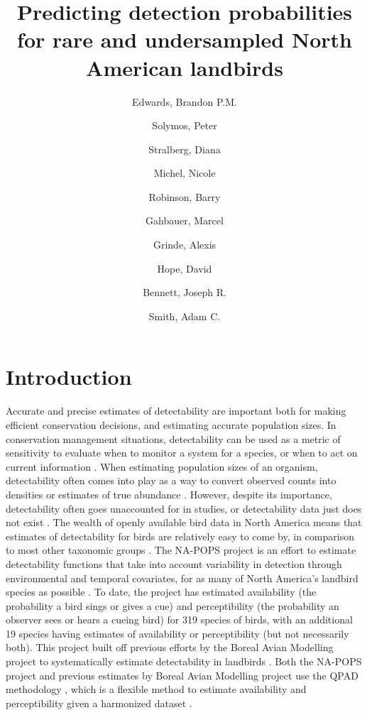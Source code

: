 \documentclass[12pt]{article}
\title{Predicting detection probabilities for rare and undersampled North American landbirds}
\author{
	Edwards, Brandon P.M.\\
	\and
	Solymos, Peter\\
	\and
	Stralberg, Diana\\
	\and
	Michel, Nicole\\
	\and
	Robinson, Barry\\
	\and
	Gahbauer, Marcel\\
	\and
	Grinde, Alexis\\
	\and
	Hope, David\\
	\and
	Bennett, Joseph R.\\
	\and
	Smith, Adam C.\\
}
\begin{document}
\maketitle

\begin{abstract}

\end{abstract}

\section{Introduction}

\par Accurate and precise estimates of detectability are important both for making efficient conservation decisions, and estimating accurate population sizes.
In conservation management situations, detectability can be used as a metric of sensitivity to evaluate when to monitor a system for a species, or when to act on current information \citep{canessa_when_2015, bennett_when_2018}. 
When estimating population sizes of an organism, detectability often comes into play as a way to convert observed counts into densities or estimates of true abundance \citep{solymos_calibrating_2013, johnson_defense_2008}.
However, despite its importance, detectability often goes unaccounted for in studies, or detectability data just does not exist \citep{bennett_how_2023}.
The wealth of openly available bird data in North America means that estimates of detectability for birds are relatively easy to come by, in comparison to most other taxonomic groups \citep{bennett_how_2023}. 
The NA-POPS project is an effort to estimate detectability functions that take into account variability in detection through environmental and temporal covariates, for as many of North America’s landbird species as possible \citep{edwards_point_2023}.
To date, the project has estimated availability (the probability a bird sings or gives a cue) and perceptibility (the probability an observer sees or hears a cueing bird) for 319 species of birds, with an additional 19 species having estimates of availability or perceptibility (but not necessarily both). This project built off previous efforts by the Boreal Avian Modelling project \citep{cumming_toward_2010} to systematically estimate detectability in landbirds \citep{solymos_calibrating_2013, solymos_evaluating_2018}.
Both the NA-POPS project and previous estimates by Boreal Avian Modelling project use the QPAD methodology \citep{solymos_calibrating_2013}, which is a flexible method to estimate availability and perceptibility given a harmonized dataset \citep{barker_ecological_2015}.
\end{document}
